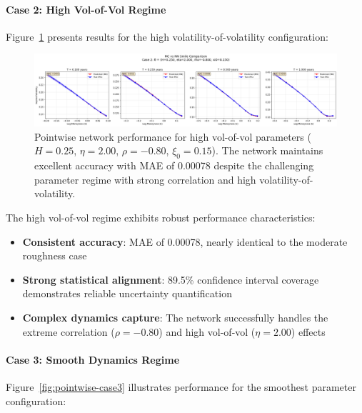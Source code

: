 	\paragraph{Case 2: High Vol-of-Vol Regime}
	
	Figure~\ref{fig:pointwise-case2} presents results for the high volatility-of-volatility configuration:
	
	\begin{figure}[ht]
		\centering
		\includegraphics[width=\textwidth]{../images/pointwise_case2_comparison.png}
		\caption{Pointwise network performance for high vol-of-vol parameters ($H = 0.25$, $\eta = 2.00$, $\rho = -0.80$, $\xi_0 = 0.15$). The network maintains excellent accuracy with MAE of 0.00078 despite the challenging parameter regime with strong correlation and high volatility-of-volatility.}
		\label{fig:pointwise-case2}
	\end{figure}
	
	The high vol-of-vol regime exhibits robust performance characteristics:
	
	\begin{itemize}[nosep]
		\item \textbf{Consistent accuracy}: MAE of 0.00078, nearly identical to the moderate roughness case
		\item \textbf{Strong statistical alignment}: 89.5\% confidence interval coverage demonstrates reliable uncertainty quantification
		\item \textbf{Complex dynamics capture}: The network successfully handles the extreme correlation ($\rho = -0.80$) and high vol-of-vol ($\eta = 2.00$) effects
	\end{itemize}
				
	\paragraph{Case 3: Smooth Dynamics Regime}
				
	Figure~\ref{fig:pointwise-case3} illustrates performance for the smoothest parameter configuration:
				
